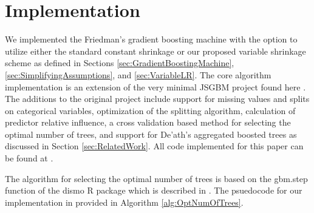 \documentclass[9pt, conference]{IEEEtran}
\begin{document}
\section{Implementation}
We implemented the Friedman's gradient boosting machine with the option to utilize either the standard constant shrinkage or our proposed variable shrinkage scheme as defined in Sections \ref{sec:GradientBoostingMachine}, \ref{sec:SimplifyingAssumptions}, and \ref{sec:VariableLR}. The core algorithm implementation is an extension of the very minimal JSGBM project found here \cite{jsgbm}. The additions to the original project include support for missing values and splits on categorical variables, optimization of the splitting algorithm, calculation of predictor relative influence, a cross validation based method for selecting the optimal number of trees, and support for De'ath's aggregated boosted trees as discussed in Section \ref{sec:RelatedWork}. All code implemented for this paper can be found at \cite{myGithub}.

The algorithm for selecting the optimal number of trees is based on the gbm.step function of the dismo R package which is described in \cite{ecological}. The psuedocode for our implementation in provided in Algorithm \ref{alg:OptNumOfTrees}.
\end{document}
